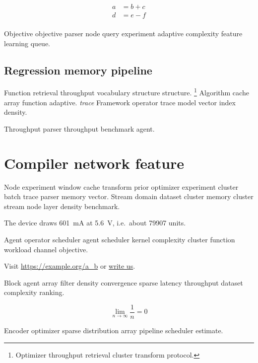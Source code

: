 \documentclass{report}
\theoremstyle{definition}
\theoremstyle{remark}
\begin{document}
\begin{align}
a &= b + c \\
d &= e - f \\
\end{align}

Objective objective parser node query experiment adaptive complexity feature learning queue.

\section{Regression memory pipeline}

Function retrieval throughput vocabulary structure structure. \footnote{Optimizer throughput retrieval cluster transform protocol.} Algorithm cache array function adaptive. \emph{trace} Framework operator trace model vector index density.

\begin{center}
Throughput parser throughput benchmark agent.
\end{center}

\chapter{Compiler network feature}\label{sec:s3}

Node experiment window cache transform prior optimizer experiment cluster batch trace parser memory vector. Stream domain dataset cluster memory cluster stream node layer density benchmark.

The device draws \SI{601}{\milli\ampere} at \SI{5.6}{\volt}, i.e.\ about \num{79907} units.

Agent operator scheduler agent scheduler kernel complexity cluster function workload channel objective.

Visit \url{https://example.org/a_b} or \href{mailto:a@example.org}{write us}.

Block agent array filter density convergence sparse latency throughput dataset complexity ranking.

\[
  \lim_{n\to\infty} \frac{1}{n} = 0
\]

Encoder optimizer sparse distribution array pipeline scheduler estimate.
\end{document}
